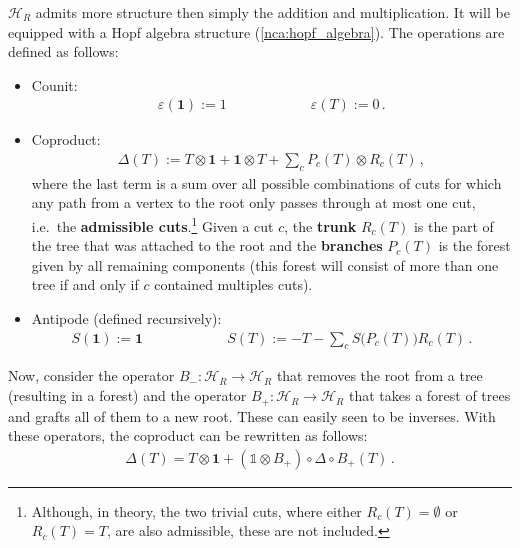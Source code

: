    $\mathcal{H}_R$ admits more structure then simply the addition and multiplication. It will be equipped with a Hopf algebra structure (\cref{nca:hopf_algebra}). The operations are defined as follows:
    \begin{itemize}
        \item Counit:
        \begin{gather}
            \varepsilon(\mathbf{1}):=1 \qquad\qquad\qquad \varepsilon(T):=0\,.
        \end{gather}
        \item Coproduct:
        \begin{gather}
            \Delta(T) := T\otimes\mathbf{1}+\mathbf{1}\otimes T+\sum_cP_c(T)\otimes R_c(T)\,,
        \end{gather}
        where the last term is a sum over all possible combinations of cuts for which any path from a vertex to the root only passes through at most one cut, i.e.~the \textbf{admissible cuts}.\footnote{Although, in theory, the two trivial cuts, where either $R_c(T)=\emptyset$ or $R_c(T)=T$, are also admissible, these are not included.} Given a cut $c$, the \textbf{trunk} $R_c(T)$ is the part of the tree that was attached to the root and the \textbf{branches} $P_c(T)$ is the forest given by all remaining components (this forest will consist of more than one tree if and only if $c$ contained multiples cuts).
        \item Antipode (defined recursively):
        \begin{gather}
            S(\mathbf{1}) := \mathbf{1} \qquad\qquad\qquad S(T) := -T-\sum_cS\bigl(P_c(T)\bigr)R_c(T)\,.
        \end{gather}
    \end{itemize}
    Now, consider the operator $B_-:\mathcal{H}_R\rightarrow\mathcal{H}_R$ that removes the root from a tree (resulting in a forest) and the operator $B_+:\mathcal{H}_R\rightarrow\mathcal{H}_R$ that takes a forest of trees and grafts all of them to a new root. These can easily seen to be inverses. With these operators, the coproduct can be rewritten as follows:
    \begin{gather}
        \Delta(T) = T\otimes\mathbf{1} + (\mathbb{1}\otimes B_+)\circ\Delta\circ B_+(T)\,.
    \end{gather}

